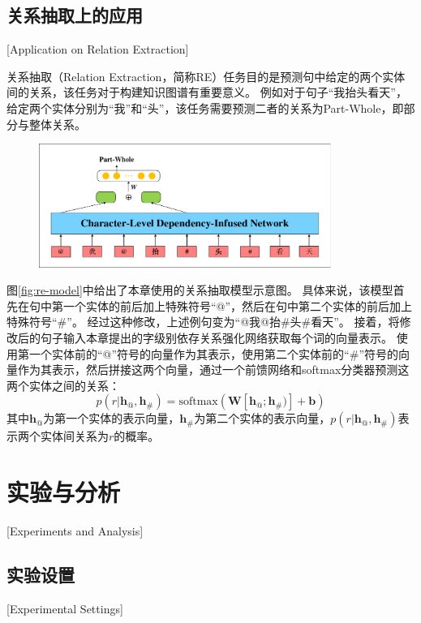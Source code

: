 \subsection{关系抽取上的应用}[Application on Relation Extraction]
\label{sec:chapter5-re-model}

关系抽取（Relation Extraction，简称RE）任务目的是预测句中给定的两个实体间的关系，该任务对于构建知识图谱有重要意义。
例如对于句子“我抬头看天”，给定两个实体分别为“我”和“头”，该任务需要预测二者的关系为Part-Whole，即部分与整体关系。

\begin{figure}[hbtp]
	\centering
	\includegraphics[width=0.85\textwidth]{figures/re-model.pdf}
\end{figure}

图\ref{fig:re-model}中给出了本章使用的关系抽取模型示意图。
具体来说，该模型首先在句中第一个实体的前后加上特殊符号“@”，然后在句中第二个实体的前后加上特殊符号“\#”。
经过这种修改，上述例句变为“@我@抬\#头\#看天”。
接着，将修改后的句子输入本章提出的字级别依存关系强化网络获取每个词的向量表示。
使用第一个实体前的“@”符号的向量作为其表示，使用第二个实体前的“\#”符号的向量作为其表示，然后拼接这两个向量，通过一个前馈网络和softmax分类器预测这两个实体之间的关系：
\begin{equation}
    p(r|\bm{h}_{@},\bm{h}_{\#}) = \text{softmax}(\bm{W}[\bm{h}_{@};\bm{h}_{\#})] + \bm{b})
\end{equation}
其中$\bm{h}_{@}$为第一个实体的表示向量，$\bm{h}_{\#}$为第二个实体的表示向量，$ p(r|\bm{h}_{@},\bm{h}_{\#})$表示两个实体间关系为$r$的概率。

\section{实验与分析}[Experiments and Analysis]

\subsection{实验设置}[Experimental Settings]

